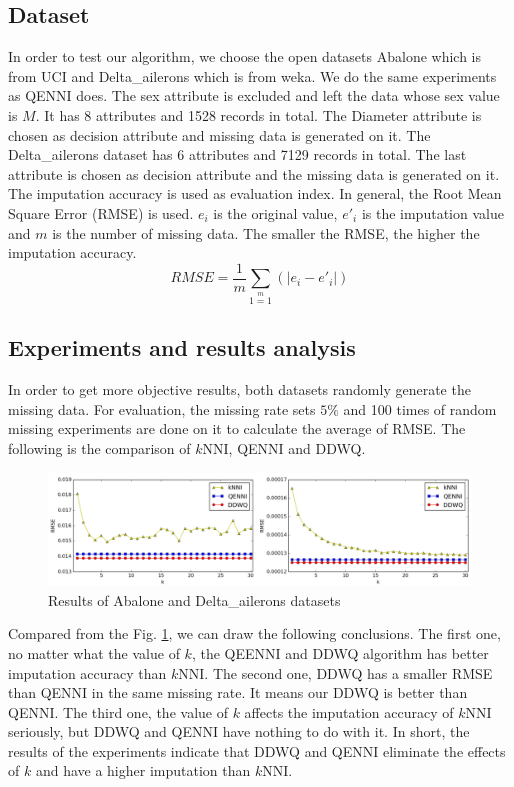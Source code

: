 \documentclass[print]{jicspack}
\begin{document}
\subsection{Dataset}
\label{sec:1.1}
In order to test our algorithm, we choose the open datasets Abalone which is from UCI and Delta\_ailerons which is from weka. We do the same experiments as QENNI does. The sex attribute is excluded and left the data whose sex value is $M$. It has 8 attributes and 1528 records in total. The Diameter attribute is chosen as decision attribute and missing data is generated on it. The Delta\_ailerons dataset has 6 attributes and 7129 records in total. The last attribute is chosen as decision attribute and the missing data is generated on it. The imputation accuracy is used as evaluation index. In general, the Root Mean Square Error (RMSE)\cite{RMSE} is used. $e_i$ is the original value, $e'_i$ is the imputation value and $m$ is the number of missing data. The smaller the RMSE, the higher the imputation accuracy.
\begin{equation}
\label{eq:6}
RMSE = \frac{1}{m}\sum\limits_{1=1}\limits^{m}(|e_i - e'_i|)
\end{equation}

\subsection{Experiments and results analysis}
In order to get more objective results, both datasets randomly generate the missing data. For evaluation, the missing rate sets $5\%$ and 100 times of random missing experiments are done on it to calculate the average of RMSE. The following is the comparison of $k$NNI, QENNI and DDWQ.

\begin{figure}[h]
\centering
\includegraphics[angle=0, width=1.0\textwidth]{figure4.png}
\caption{Results of Abalone and Delta\_ailerons datasets}
\label{fig:figure4}
\end{figure}
Compared from the Fig. \ref{fig:figure4}, we can draw the following conclusions. The first one, no matter what the value of $k$, the QEENNI and DDWQ algorithm has better imputation accuracy than $k$NNI. The second one, DDWQ has a smaller RMSE than QENNI in the same missing rate. It means our DDWQ is better than QENNI. The third one, the value of $k$ affects the imputation accuracy of $k$NNI seriously, but DDWQ and QENNI have nothing to do with it. In short, the results of the experiments indicate that DDWQ and QENNI eliminate the effects of $k$ and have a higher imputation than $k$NNI.
\end{document}
